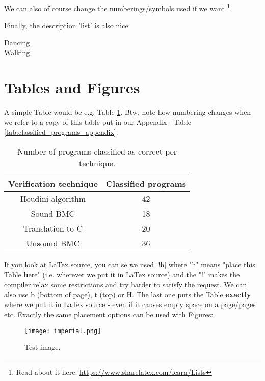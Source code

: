 We can also of course change the numberings/symbols used if we want \footnote{Read about it here: \url{https://www.sharelatex.com/learn/Lists}}.

Finally, the description 'list' is also nice:

\begin{description}
	\item[Dancing] \lipsum[1]
	\item[Walking] \lipsum[2]
\end{description}

\section{Tables and Figures}

A simple Table would be e.g. Table \ref{tab:classified_programs}. Btw, note how numbering changes when we refer to a copy of this table put in our Appendix - Table \ref{tab:classified_programs_appendix}.

\begin{table}[!h]
	\centering
	\begin{tabular}{|c|c|}
		\hline
		\textbf{Verification technique} & \textbf{Classified programs} \\ \hline
		Houdini algorithm & 42 \\\hline
		Sound BMC & 18 \\\hline
		Translation to C & 20 \\\hline
		Unsound BMC & 36 \\\hline
	\end{tabular}
	\caption{Number of programs classified as correct per technique.}
	\label{tab:classified_programs}
\end{table}


If you look at LaTex source, you can se we used [!h] where "h" means "place this Table \textbf{h}ere" (i.e. wherever we put it in LaTex source) and the "!" makes the compiler relax some restrictions and try harder to satisfy the request. We can also use b (bottom of page), t (top) or H. The last one puts the Table \textbf{exactly} where we put it in LaTex source - even if it causes empty space on a page/pages etc. Exactly the same placement options can be used with Figures:

\begin{figure}[!t]
	\begin{centering}
		\texttt{[image: imperial.png]}
		\caption{Test image.}
		\label{fig:test_imperial}
	\end{centering}
\end{figure}

